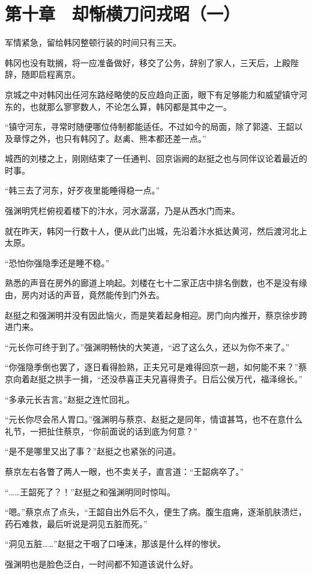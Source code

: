 \section{第十章　却惭横刀问戎昭（一）}

军情紧急，留给韩冈整顿行装的时间只有三天。

韩冈也没有耽搁，将一应准备做好，移交了公务，辞别了家人，三天后，上殿陛辞，随即启程离京。

京城之中对韩冈出任河东路经略使的反应趋向正面，眼下有足够能力和威望镇守河东的，也就那么寥寥数人，不论怎么算，韩冈都是其中之一。

“镇守河东，寻常时随便哪位侍制都能适任。不过如今的局面，除了郭逵、王韶以及章惇之外，也只有韩冈了。赵禼、熊本都还差一点。”

城西的刘楼之上，刚刚结束了一任通判、回京诣阙的赵挺之也与同伴议论着最近的时事。

“韩三去了河东，好歹夜里能睡得稳一点。”

强渊明凭栏俯视着楼下的汴水，河水潺潺，乃是从西水门而来。

就在昨天，韩冈一行数十人，便从此门出城，先沿着汴水抵达黄河，然后渡河北上太原。

“恐怕你强隐季还是睡不稳。”

熟悉的声音在房外的廊道上响起。刘楼在七十二家正店中排名倒数，也不是没有缘由，房内对话的声音，竟然能传到门外去。

赵挺之和强渊明并没有因此恼火，而是笑着起身相迎。房门向内推开，蔡京徐步跨进门来。

“元长你可终于到了。”强渊明畅快的大笑道，“迟了这么久，还以为你不来了。”

“你强隐季倒也罢了，逐日看得脸熟，正夫兄可是难得回京一趟，如何能不来？”蔡京向着赵挺之拱手一揖，“还没恭喜正夫兄喜得贵子。日后公侯万代，福泽绵长。”

“多承元长吉言。”赵挺之连忙回礼。

“元长你尽会吊人胃口。”强渊明与蔡京、赵挺之是同年，情谊甚笃，也不在意什么礼节，一把扯住蔡京，“你前面说的话到底为何意？”

“是不是哪里又出了事？”赵挺之也紧张的问道。

蔡京左右各瞥了两人一眼，也不卖关子，直言道：“王韶病卒了。”

“……王韶死了？！”赵挺之和强渊明同时惊叫。

“嗯。”蔡京点了点头，“王韶自出外后不久，便生了病。腹生疽痈，逐渐肌肤溃烂，药石难救，最后听说是洞见五脏而死。”

“洞见五脏……”赵挺之干咽了口唾沫，那该是什么样的惨状。

强渊明也是脸色泛白，一时间都不知道该说什么好。

